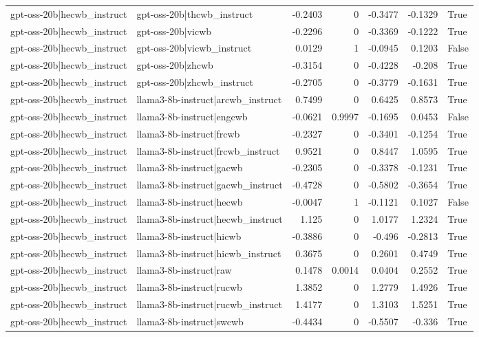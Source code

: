 \begin{table}
\begin{tabular}{l l r r r r l}
gpt-oss-20b|hecwb_instruct & gpt-oss-20b|thcwb_instruct & -0.2403 & 0 & -0.3477 & -0.1329 & True \\
gpt-oss-20b|hecwb_instruct & gpt-oss-20b|vicwb & -0.2296 & 0 & -0.3369 & -0.1222 & True \\
gpt-oss-20b|hecwb_instruct & gpt-oss-20b|vicwb_instruct & 0.0129 & 1 & -0.0945 & 0.1203 & False \\
gpt-oss-20b|hecwb_instruct & gpt-oss-20b|zhcwb & -0.3154 & 0 & -0.4228 & -0.208 & True \\
gpt-oss-20b|hecwb_instruct & gpt-oss-20b|zhcwb_instruct & -0.2705 & 0 & -0.3779 & -0.1631 & True \\
gpt-oss-20b|hecwb_instruct & llama3-8b-instruct|arcwb_instruct & 0.7499 & 0 & 0.6425 & 0.8573 & True \\
gpt-oss-20b|hecwb_instruct & llama3-8b-instruct|engcwb & -0.0621 & 0.9997 & -0.1695 & 0.0453 & False \\
gpt-oss-20b|hecwb_instruct & llama3-8b-instruct|frcwb & -0.2327 & 0 & -0.3401 & -0.1254 & True \\
gpt-oss-20b|hecwb_instruct & llama3-8b-instruct|frcwb_instruct & 0.9521 & 0 & 0.8447 & 1.0595 & True \\
gpt-oss-20b|hecwb_instruct & llama3-8b-instruct|gacwb & -0.2305 & 0 & -0.3378 & -0.1231 & True \\
gpt-oss-20b|hecwb_instruct & llama3-8b-instruct|gacwb_instruct & -0.4728 & 0 & -0.5802 & -0.3654 & True \\
gpt-oss-20b|hecwb_instruct & llama3-8b-instruct|hecwb & -0.0047 & 1 & -0.1121 & 0.1027 & False \\
gpt-oss-20b|hecwb_instruct & llama3-8b-instruct|hecwb_instruct & 1.125 & 0 & 1.0177 & 1.2324 & True \\
gpt-oss-20b|hecwb_instruct & llama3-8b-instruct|hicwb & -0.3886 & 0 & -0.496 & -0.2813 & True \\
gpt-oss-20b|hecwb_instruct & llama3-8b-instruct|hicwb_instruct & 0.3675 & 0 & 0.2601 & 0.4749 & True \\
gpt-oss-20b|hecwb_instruct & llama3-8b-instruct|raw & 0.1478 & 0.0014 & 0.0404 & 0.2552 & True \\
gpt-oss-20b|hecwb_instruct & llama3-8b-instruct|rucwb & 1.3852 & 0 & 1.2779 & 1.4926 & True \\
gpt-oss-20b|hecwb_instruct & llama3-8b-instruct|rucwb_instruct & 1.4177 & 0 & 1.3103 & 1.5251 & True \\
gpt-oss-20b|hecwb_instruct & llama3-8b-instruct|swcwb & -0.4434 & 0 & -0.5507 & -0.336 & True \\

\end{tabular}
\end{table}
